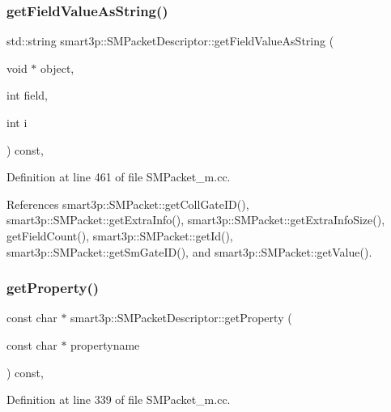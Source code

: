\subsubsection{\texorpdfstring{get\+Field\+Value\+As\+String()}{getFieldValueAsString()}}
{\footnotesize\ttfamily std\+::string smart3p\+::\+S\+M\+Packet\+Descriptor\+::get\+Field\+Value\+As\+String (\begin{DoxyParamCaption}\item[{void $\ast$}]{object,  }\item[{int}]{field,  }\item[{int}]{i }\end{DoxyParamCaption}) const\hspace{0.3cm}{\ttfamily [override]}, {\ttfamily [virtual]}}



Definition at line 461 of file S\+M\+Packet\+\_\+m.\+cc.



References smart3p\+::\+S\+M\+Packet\+::get\+Coll\+Gate\+I\+D(), smart3p\+::\+S\+M\+Packet\+::get\+Extra\+Info(), smart3p\+::\+S\+M\+Packet\+::get\+Extra\+Info\+Size(), get\+Field\+Count(), smart3p\+::\+S\+M\+Packet\+::get\+Id(), smart3p\+::\+S\+M\+Packet\+::get\+Sm\+Gate\+I\+D(), and smart3p\+::\+S\+M\+Packet\+::get\+Value().

\mbox{\label{classsmart3p_1_1SMPacketDescriptor_afaf28d721c4a737e995c2fa96f3980b6}} 
\subsubsection{\texorpdfstring{get\+Property()}{getProperty()}}
{\footnotesize\ttfamily const char $\ast$ smart3p\+::\+S\+M\+Packet\+Descriptor\+::get\+Property (\begin{DoxyParamCaption}\item[{const char $\ast$}]{propertyname }\end{DoxyParamCaption}) const\hspace{0.3cm}{\ttfamily [override]}, {\ttfamily [virtual]}}



Definition at line 339 of file S\+M\+Packet\+\_\+m.\+cc.

\mbox{\label{classsmart3p_1_1SMPacketDescriptor_a0b6d929f61cf3bf70beabd18b27ded6b}} 
